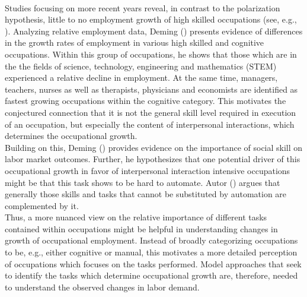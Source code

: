 \documentclass[../main.tex]{subfiles}
\begin{document}
\\
Studies focusing on more recent years reveal, in contrast to the polarization hypothesis, little to no employment growth of high skilled occupations (see, e.g., \cite{beaudry2016great}). Analyzing relative employment data, Deming (\citeyear{deming2017growing}) presents evidence of differences in the growth rates of employment in various high skilled and cognitive occupations. Within this group of occupations, he shows that those which are in the the fields of science, technology, engineering and mathematics (STEM) experienced a relative decline in employment. At the same time, managers, teachers, nurses as well as therapists, physicians and economists are identified as fastest growing occupations within the cognitive category. This motivates the conjectured connection that it is not the general skill level required in execution of an occupation, but especially the content of interpersonal interactions, which determines the occupational growth.
\\
Building on this, Deming (\citeyear{deming2017growing}) provides evidence on the importance of social skill on labor market outcomes. Further, he hypothesizes that one potential driver of this occupational growth in favor of interpersonal interaction intensive occupations might be that this task shows to be hard to automate. Autor (\citeyear{autor2015there}) argues that generally those skills and tasks that cannot be substituted by automation are complemented by it. 
\\
Thus, a  more nuanced view on the relative importance of different tasks contained within occupations might be helpful in understanding changes in growth of occupational employment. Instead of broadly categorizing occupations to be, e.g., either cognitive or manual, this motivates a more detailed perception of occupations which focuses on the tasks performed. Model approaches that seek to identify the tasks which determine occupational growth are, therefore, needed to understand the observed changes in labor demand.
\\
\end{document}
